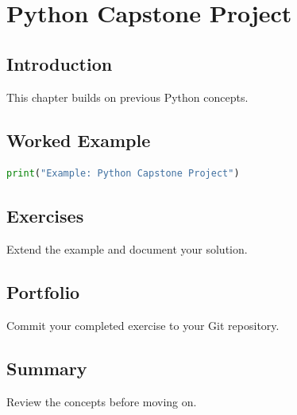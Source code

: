 \chapter{Python Capstone Project}
\label{chap:vol3-20}



\section{Introduction}
This chapter builds on previous Python concepts.

\section{Worked Example}
\begin{lstlisting}[language=Python]
print("Example: Python Capstone Project")
\end{lstlisting}

\section{Exercises}
\begin{exercise}
Extend the example and document your solution.
\end{exercise}

\section{Portfolio}
Commit your completed exercise to your Git repository.

\section{Summary}
Review the concepts before moving on.
